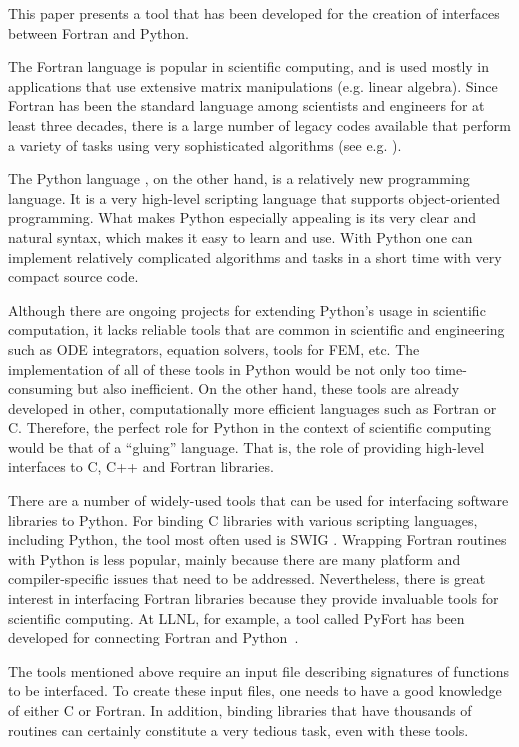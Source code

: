 \documentclass[twocolumn]{article}
\begin{document}
This paper presents a tool that has been developed for the creation of
interfaces between Fortran and Python.


The Fortran language is popular in
scientific computing, and is used mostly in applications that use
extensive matrix manipulations (e.g. linear algebra). Since Fortran
 has been the standard language among scientists and engineers for
 at least three decades, there is a large number of legacy codes available that
 perform a variety of tasks using very sophisticated algorithms (see
e.g. \cite{netlib}).

The Python language \cite{python}, on the other hand, is a relatively
new programming language. It is a very high-level scripting language
that supports object-oriented programming. What makes Python
especially appealing is its very clear and natural syntax, which makes it
easy to learn and use. With Python one can implement relatively
complicated algorithms and tasks in a short time with very compact
source code.

Although there are ongoing projects for extending Python's usage in
scientific computation, it lacks reliable tools that are common in
scientific and engineering such as ODE integrators, equation solvers,
tools for FEM, etc.  The implementation of all of these tools in Python
would be not only too time-consuming but also inefficient.  On the
other hand, these tools are already developed in other,
computationally more efficient languages such as Fortran or C.
Therefore, the perfect role for Python in the context of scientific
computing would be that of a ``gluing'' language.  That is, the role
of providing high-level interfaces to C, C++ and Fortran libraries.

There are a number of widely-used tools that can be used for interfacing
software libraries to Python. For binding C libraries with various
scripting languages, including Python, the tool most often used is
SWIG \cite{swig}. Wrapping Fortran routines with Python is less
popular, mainly because there are many platform and compiler-specific
issues that need to be addressed. Nevertheless, there is great
interest in interfacing Fortran libraries because they provide
invaluable tools for scientific computing. At LLNL, for example, a tool
called PyFort has been developed for connecting Fortran and
Python~\cite{pyfort}.

The tools mentioned above require an input file describing signatures
of functions to be interfaced. To create these input files, one needs
to have a good knowledge of either C or Fortran. In addition,
binding libraries that have thousands of routines can certainly constitute a
very tedious task, even with these tools.
\end{document}
